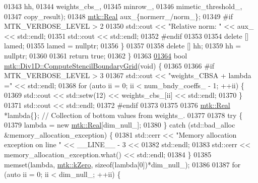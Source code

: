\begin{DoxyCode}
{{01343                                                         hh,
01344                                                         weights\_cbs\_,
01345                                                         minrow\_,
01346                                                         mimetic\_threshold\_,
01347                                                         copy\_result);
01348     \hyperlink{group__c01-roots_gac080bbbf5cbb5502c9f00405f894857d}{mtk::Real} aux\_\{normerr\_/norm\_\};
01349 \textcolor{preprocessor}{    #if MTK\_VERBOSE\_LEVEL > 2}
01350     std::cout << \textcolor{stringliteral}{"Relative norm: "} << aux\_ << std::endl;
01351     std::cout << std::endl;
01352 \textcolor{preprocessor}{    #endif}
01353 
01354     \textcolor{keyword}{delete} [] lamed;
01355     lamed = \textcolor{keyword}{nullptr};
01356   \}
01357 
01358   \textcolor{keyword}{delete} [] hh;
01359   hh = \textcolor{keyword}{nullptr};
01360 
01361   \textcolor{keywordflow}{return} \textcolor{keyword}{true};
01362 \}
01363 
\hypertarget{mtk__div__1d_8cc_source_l01364}{}\hyperlink{classmtk_1_1Div1D_a29bb417c76286414dce9258a0bcb5aab}{01364} \textcolor{keywordtype}{bool} \hyperlink{classmtk_1_1Div1D_a29bb417c76286414dce9258a0bcb5aab}{mtk::Div1D::ComputeStencilBoundaryGrid}(\textcolor{keywordtype}{void}) \{
01365 
01366 \textcolor{preprocessor}{  #if MTK\_VERBOSE\_LEVEL > 3}
01367   std::cout << \textcolor{stringliteral}{"weights\_CBSA + lambda ="} << std::endl;
01368   \textcolor{keywordflow}{for} (\textcolor{keyword}{auto} ii = 0; ii < num\_bndy\_coeffs\_ - 1; ++ii) \{
01369     std::cout << std::setw(12) << weights\_cbs\_[ii] << std::endl;
01370   \}
01371   std::cout << std::endl;
01372 \textcolor{preprocessor}{  #endif}
01373 
01375 
01376   \hyperlink{group__c01-roots_gac080bbbf5cbb5502c9f00405f894857d}{mtk::Real} *lambda\{\}; \textcolor{comment}{// Collection of bottom values from weights\_.}
01377 
01378   \textcolor{keywordflow}{try} \{
01379     lambda = \textcolor{keyword}{new} \hyperlink{group__c01-roots_gac080bbbf5cbb5502c9f00405f894857d}{mtk::Real}[dim\_null\_];
01380   \} \textcolor{keywordflow}{catch} (std::bad\_alloc &memory\_allocation\_exception) \{
01381     std::cerr << \textcolor{stringliteral}{"Memory allocation exception on line "} << \_\_LINE\_\_ - 3 <<
01382       std::endl;
01383     std::cerr << memory\_allocation\_exception.what() << std::endl;
01384   \}
01385   memset(lambda, \hyperlink{group__c01-roots_ga59a451a5fae30d59649bcda274fea271}{mtk::kZero}, \textcolor{keyword}{sizeof}(lambda[0])*dim\_null\_);
01386 
01387   \textcolor{keywordflow}{for} (\textcolor{keyword}{auto} ii = 0; ii < dim\_null\_; ++ii) \{
}}
\end{DoxyCode}
